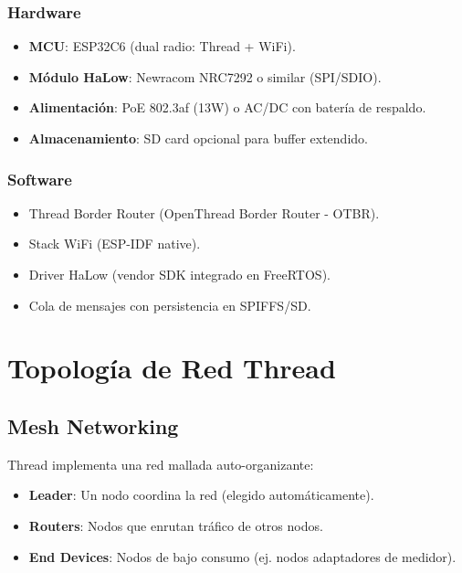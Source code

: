 \subsubsection{Hardware}

\begin{itemize}
    \item \textbf{MCU}: ESP32C6 (dual radio: Thread + WiFi).
    \item \textbf{Módulo HaLow}: Newracom NRC7292 o similar (SPI/SDIO).
    \item \textbf{Alimentación}: PoE 802.3af (13W) o AC/DC con batería de respaldo.
    \item \textbf{Almacenamiento}: SD card opcional para buffer extendido.
\end{itemize}

\subsubsection{Software}

\begin{itemize}
    \item Thread Border Router (OpenThread Border Router - OTBR).
    \item Stack WiFi (ESP-IDF native).
    \item Driver HaLow (vendor SDK integrado en FreeRTOS).
    \item Cola de mensajes con persistencia en SPIFFS/SD.
\end{itemize}

\section{Topología de Red Thread}

\subsection{Mesh Networking}

Thread implementa una red mallada auto-organizante:
\begin{itemize}
    \item \textbf{Leader}: Un nodo coordina la red (elegido automáticamente).
    \item \textbf{Routers}: Nodos que enrutan tráfico de otros nodos.
    \item \textbf{End Devices}: Nodos de bajo consumo (ej. nodos adaptadores de medidor).
\end{itemize}

